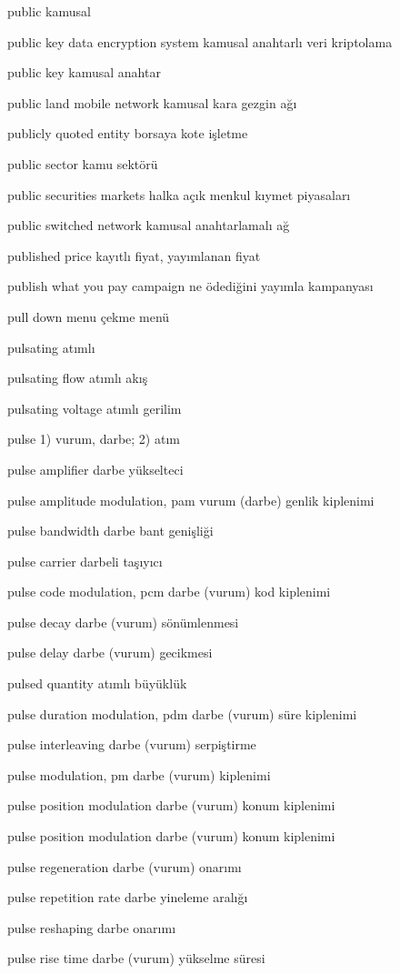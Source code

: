 \documentclass[12pt,fleqn]{article}\usepackage{../../common}
\begin{document}
public kamusal

public key data encryption system kamusal anahtarlı veri kriptolama

public key kamusal anahtar

public land mobile network kamusal kara gezgin ağı

publicly quoted entity borsaya kote işletme

public sector kamu sektörü

public securities markets halka açık menkul kıymet piyasaları

public switched network kamusal anahtarlamalı ağ

published price kayıtlı fiyat, yayımlanan fiyat

publish what you pay campaign ne ödediğini yayımla kampanyası

pull down menu çekme menü

pulsating atımlı

pulsating flow atımlı akış

pulsating voltage atımlı gerilim

pulse 1) vurum, darbe; 2) atım

pulse amplifier darbe yükselteci

pulse amplitude modulation, pam vurum (darbe) genlik kiplenimi

pulse bandwidth darbe bant genişliği

pulse carrier darbeli taşıyıcı

pulse code modulation, pcm darbe (vurum) kod kiplenimi

pulse decay darbe (vurum) sönümlenmesi

pulse delay darbe (vurum) gecikmesi

pulsed quantity atımlı büyüklük

pulse duration modulation, pdm darbe (vurum) süre kiplenimi

pulse interleaving darbe (vurum) serpiştirme

pulse modulation, pm darbe (vurum) kiplenimi

pulse position modulation darbe (vurum) konum kiplenimi

pulse position modulation darbe (vurum) konum kiplenimi

pulse regeneration darbe (vurum) onarımı

pulse repetition rate darbe yineleme aralığı

pulse reshaping darbe onarımı

pulse rise time darbe (vurum) yükselme süresi
\end{document}
